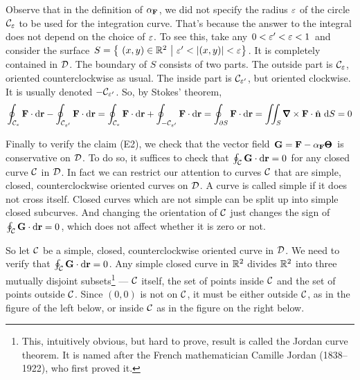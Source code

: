 Observe that in the definition of $\alpha_{\mathbf{F}}$, we did not specify the radius
$\varepsilon$ of the circle $\mathcal{C}_\varepsilon$ to be used for the integration curve.
That's because the answer to the integral does not depend on the choice
of $\varepsilon$. To see this, take any $0<\varepsilon'<\varepsilon<1$ and consider the
surface $S=\big\{\ (x,y)\in\bbbr^2\ \big|\ \veps'<|(x,y)|<\veps\big\}$.
It is completely contained in $\mathcal{D}$.  The boundary of $S$ consists of two 
parts. The outside part is $\mathcal{C}_\varepsilon$, oriented counterclockwise as usual.
The inside part is $\mathcal{C}_{\varepsilon'}$, but oriented clockwise. It is usually
denoted $-\mathcal{C}_{\varepsilon'}$. So, by Stokes' theorem,
\begin{equation*}
\oint_{\cC_\veps}\vF\cdot \dee{\vr}
        -\oint_{\cC_{\veps'}}\vF\cdot \dee{\vr}
=\oint_{\cC_\veps}\vF\cdot \dee{\vr}
        +\oint_{-\cC_{\veps'}}\vF\cdot \dee{\vr}
=\oint_{\partial S}\vF\cdot \dee{\vr}
=\dblInt_S \vnabla\times\vF\cdot\hn\ \dee{S}
=0
\end{equation*}

Finally to verify the claim (E2), we check that the 
vector field $\mathbf{G}=\mathbf{F}-\alpha_{\mathbf{F}}{\pmb{\Theta}}$
is conservative on $\mathcal{D}$. To do so, it suffices to check that 
$\oint_{\mathcal{C}}\mathbf{G}\cdot \mathrm{d}\mathbf{r}=0$ for any closed curve $\mathcal{C}$ in $\mathcal{D}$.
In fact we can restrict our attention to curves $\mathcal{C}$ that are simple,
closed, counterclockwise oriented curves on $\mathcal{D}$. A curve is called 
simple if it does not cross itself. Closed curves which are not simple 
can be split up into simple closed subcurves. And changing the 
orientation of $\mathcal{C}$ just changes the sign of 
$\oint_{\mathcal{C}}\mathbf{G}\cdot \mathrm{d}\mathbf{r}=0$, 
which does not affect whether it is zero or not. 

So let $\mathcal{C}$ be 
a simple, closed, counterclockwise oriented curve in $\mathcal{D}$. We need 
to verify that $\oint_{\mathcal{C}}\mathbf{G}\cdot \mathrm{d}\mathbf{r}=0$. Any simple closed curve in 
$\mathbb{R}^2$ divides $\mathbb{R}^2$ into three mutually disjoint 
subsets\footnote{This, intuitively obvious, but hard to prove, result
is called the Jordan curve theorem. It is named after the French mathematician
Camille Jordan (1838--1922), who first proved it.} --- 
$\mathcal{C}$ itself, the set of points inside $\mathcal{C}$ and the set of points 
outside $\mathcal{C}$. Since $(0,0)$ is not on $\mathcal{C}$, it must be either outside $\mathcal{C}$,
as in the figure of the left below,  or inside $\mathcal{C}$ as in the figure on the right below.

